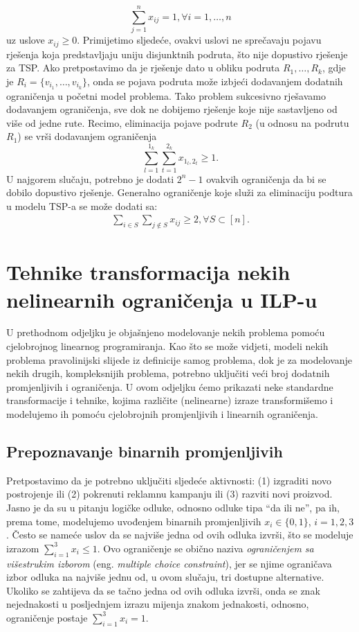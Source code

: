\documentclass[a4paper, utf8, 11pt, colorlinks]{book}
\theoremstyle{definition}
\begin{document}
$$  \sum_{j=1}^n x_{ij} = 1, \forall i =1,\ldots, n$$ 
 uz uslove $x_{ij}\geq 0$. Primijetimo sljedeće, ovakvi uslovi ne sprečavaju pojavu rješenja koja predstavljaju uniju disjunktnih podruta, što nije dopustivo rješenje za TSP. Ako pretpostavimo da je rješenje dato u obliku podruta $R_1, \ldots, R_k$, gdje je $R_i = \{ v_{i_1}, \ldots, v_{i_k} \}$, onda se pojava podruta  može izbjeći  dodavanjem dodatnih ograničenja u početni model problema. Tako problem sukcesivno rješavamo dodavanjem ograničenja, sve dok ne dobijemo rješenje koje nije sastavljeno od više od jedne rute. Recimo, eliminacija pojave podrute $R_2$ (u odnosu na podrutu $R_1$) se vrši dodavanjem ograničenja
 $$ \sum_{l=1}^{1_k}\sum_{t=1}^{2_k} x_{1_l, 2_t} \geq 1.$$
 U najgorem slučaju, potrebno je dodati $2^n-1$ ovakvih ograničenja da bi se dobilo dopustivo rješenje. 
 Generalno ograničenje koje služi za eliminaciju podtura u modelu TSP-a se može dodati sa:
 \begin{align}
 	  \sum_{i \in S} \sum_{j \notin S} x_{ij} \geq 2, \forall S \subset [n].
 \end{align}
 
 \section{Tehnike transformacija nekih nelinearnih ograničenja u  ILP-u}\label{sec:transformILP}
 
 U prethodnom odjeljku je objašnjeno modelovanje nekih problema pomoću cjelobrojnog linearnog programiranja. Kao što se može vidjeti, modeli nekih problema pravolinijski slijede iz definicije samog problema, dok je za modelovanje nekih drugih, kompleksnijih problema, potrebno uključiti veći broj dodatnih promjenljivih i ograničenja. U ovom odjeljku ćemo prikazati neke standardne transformacije i tehnike, kojima različite (nelinearne) izraze transformišemo i modelujemo ih pomoću cjelobrojnih promjenljivih i linearnih ograničenja.
 
  
 
\subsection{Prepoznavanje binarnih promjenljivih}
 Pretpostavimo da je potrebno uključiti sljedeće aktivnosti: (1) izgraditi novo postrojenje ili
(2) pokrenuti reklamnu kampanju ili (3) razviti novi proizvod. Jasno je da su u pitanju logičke odluke, odnosno odluke tipa ``da ili ne'', pa ih, prema tome, modelujemo   uvođenjem  binarnih promjenljivih $x_i \in \{0, 1 \}$, $i=1,2,3$. Često se nameće uslov da se najviše jedna od ovih odluka izvrši, što se modeluje izrazom $\sum_{i=1}^3 x_i \leq 1$. Ovo ograničenje se obično naziva \emph{ograničenjem sa višestrukim izborom} (eng. \emph{multiple choice constraint}), jer se njime ograničava izbor odluka na najviše jednu od, u ovom slučaju, tri dostupne alternative. Ukoliko se zahtijeva da se tačno jedna od ovih odluka izvrši, onda se znak nejednakosti u posljednjem izrazu mijenja znakom jednakosti, odnosno, ograničenje postaje $\sum_{i=1}^3 x_i = 1$.
\end{document}
